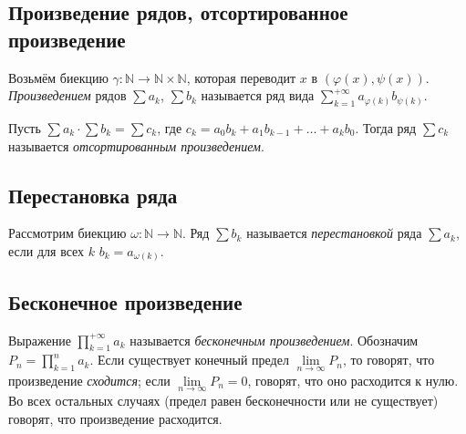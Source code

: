 \subsection{Произведение рядов, отсортированное произведение}

\begin{ndefinition}
	Возьмём биекцию \(\gamma \colon \mathbb{N} \to \mathbb{N} \times \mathbb{N}\), которая переводит \(x\) в \((\varphi(x), \psi(x))\). \textit{Произведением} рядов \(\sum a_k\), \(\sum b_k\) называется ряд вида \(\sum_{k=1}^{+\infty} a_{\varphi(k)} b_{\psi(k)}\).
\end{ndefinition}

\begin{ndefinition}
	Пусть \(\sum a_k \cdot \sum b_k = \sum c_k\), где \(c_k = a_0 b_k + a_1 b_{k-1} + \ldots + a_k b_0\). Тогда ряд \(\sum c_k\) называется \textit{отсортированным произведением}.
\end{ndefinition}

\subsection{Перестановка ряда}

\begin{definition}
	Рассмотрим биекцию \(\omega \colon \mathbb{N} \to \mathbb{N}\). Ряд \(\sum b_k\) называется \textit{перестановкой} ряда \(\sum a_k\), если для всех \(k\) \(b_k = a_{\omega(k)}\). 
\end{definition}

\subsection{Бесконечное произведение}

\begin{definition}
	Выражение \(\prod\limits_{k=1}^{+\infty} a_k\) называется \textit{бесконечным произведением}. Обозначим \(P_n = \prod\limits_{k=1}^{n} a_k\). Если существует конечный предел \(\lim\limits_{n \to \infty} P_n\), то говорят, что произведение \textit{сходится}; если \(\lim\limits_{n \to \infty} P_n = 0\), говорят, что оно расходится к нулю. Во всех остальных случаях (предел равен бесконечности или не существует) говорят, что произведение расходится.
\end{definition}

